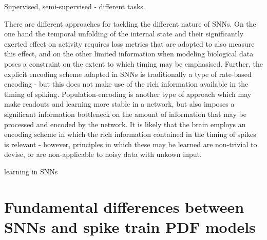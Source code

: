 \documentclass[mphil,deptreport,ai]{infthesis} %
\begin{document}
Supervised, semi-supervised - different tasks.

There are different approaches for tackling the different nature of SNNs. 
On the one hand the temporal unfolding of the internal state and their significantly exerted effect on activity requires loss metrics that are adopted to also measure this effect, and on the other limited information when modeling biological data poses a constraint on the extent to which timing may be emphasised.
Further, the explicit encoding scheme adapted in SNNs is traditionally a type of rate-based encoding - but this does not make use of the rich information available in the timing of spiking.
Population-encoding is another type of approach which may make readouts and learning more stable in a network, but also imposes a significant information bottleneck on the amount of information that may be processed and encoded by the network.
It is likely that the brain employs an encoding scheme in which the rich information contained in the timing of spikes is relevant - however, principles in which these may be learned are non-trivial to devise, or are non-applicable to noisy data with unkown input.

\cite{Taherkhani2020} learning in SNNs



\section{Fundamental differences between SNNs and spike train PDF models}
\end{document}
